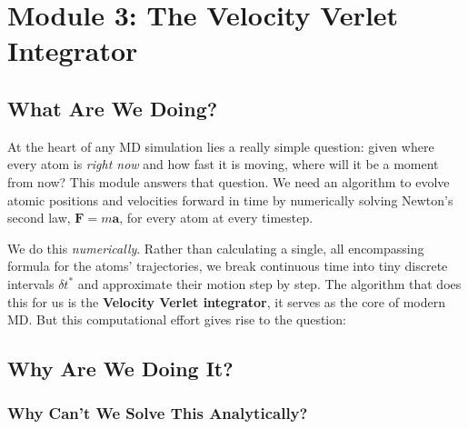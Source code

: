 %

\newpage
\section{Module 3: The Velocity Verlet Integrator}

\subsection{What Are We Doing?}

At the heart of any MD simulation lies a really simple question: given where every atom is \emph{right now} and how fast it is moving, where will it be a moment from now? This module answers that question. We need an algorithm to evolve atomic positions and velocities forward in time by numerically solving Newton's second law, $\mathbf{F} = m\mathbf{a}$, for every atom at every timestep.

We do this \emph{numerically}. Rather than calculating a single, all encompassing formula for the atoms' trajectories, we break continuous time into tiny discrete intervals $\delta t^*$ and approximate their motion step by step. The algorithm that does this for us is the \textbf{Velocity Verlet integrator}, it serves as the core of modern MD. But this computational effort gives rise to the question:

\subsection{Why Are We Doing It?}

\subsubsection{Why Can't We Solve This Analytically?}


